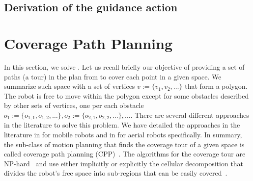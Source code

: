 \subsection{\color{red}Derivation of the guidance action}



\section{Coverage Path Planning}
\label{sec:cov-path-plan}

In this section, we solve . Let us recall briefly our objective of providing a set of paths (a tour) in the plan from  to cover each point in a given space. We summarize such space with a set of vertices $v:=\{v_1,v_2,\dots\}$ that form a polygon. The robot is free to move within the polygon except for some obstacles described by other sets of vertices, one per each obstacle $o_1:=\{o_{1,1},o_{1,2},\dots\},o_2:=\{o_{2,1},o_{2,2},\dots\},\dots$. There are several different approaches in the literature to solve this problem. We have detailed the approaches in the literature in  for mobile robots and in  for aerial robots specifically. In summary, the sub-class of motion planning that finds the coverage tour of a given space is called coverage path planning (CPP)~\citep{choset1998coverage}. The algorithms for the coverage tour are NP-hard~\citep{arkin2000approximation} and use either implicitly or explicitly the cellular decomposition that divides the robot's free space into sub-regions that can be easily covered~\citep{choset2001coverage,galceran2013survey}.

